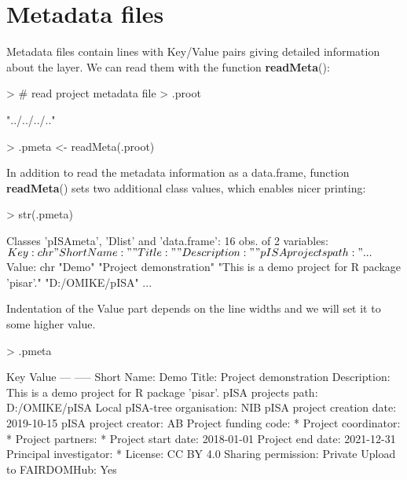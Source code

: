 \documentclass[a4paper,12pt]{article}\usepackage[]{graphicx}\usepackage[]{color}
\makeatletter
\providecommand\code{\bgroup\@codex}
\def\@codex#1{{\normalfont\ttfamily\hyphenchar\font=-1  #1}\egroup}
\providecommand{\fct}[1]{{\ttfamily\textbf{#1}()}}
\makeatother
\begin{document}
\section{Metadata files}

Metadata files contain lines with Key/Value pairs
giving detailed information about the layer. We can read them with the function \fct{readMeta}:

\begin{Schunk}
\begin{Sinput}
> # read project metadata file
> .proot
\end{Sinput}
\begin{Soutput}
[1] "../../../.."
\end{Soutput}
\begin{Sinput}
> .pmeta <- readMeta(.proot)
\end{Sinput}
\end{Schunk}

In addition to read the metadata information as a \code{data.frame}, function
\fct{readMeta} sets two additional class values, which enables nicer printing:

\begin{Schunk}
\begin{Sinput}
> str(.pmeta)
\end{Sinput}
\begin{Soutput}
Classes 'pISAmeta', 'Dlist' and 'data.frame':	16 obs. of  2 variables:
 $ Key  : chr  "Short Name:" "Title:" "Description:" "pISA projects path:" ...
 $ Value: chr  "Demo" "Project demonstration" "This is a demo project for R package 'pisar'." "D:/OMIKE/pISA" ...
\end{Soutput}
\end{Schunk}

Indentation of the Value part depends on the line widths and we will set it to some higher value.

\begin{Schunk}
\begin{Sinput}
> .pmeta
\end{Sinput}
\begin{Soutput}
 Key                           Value
 ---                           -----
 Short Name:                   Demo
 Title:                        Project demonstration
 Description:                  This is a demo project for R package 'pisar'.
 pISA projects path:           D:/OMIKE/pISA
 Local pISA-tree organisation: NIB
 pISA project creation date:   2019-10-15
 pISA project creator:         AB
 Project funding code:         *
 Project coordinator:          *
 Project partners:             *
 Project start date:           2018-01-01
 Project end date:             2021-12-31
 Principal investigator:       *
 License:                      CC BY 4.0
 Sharing permission:           Private
 Upload to FAIRDOMHub:         Yes
\end{Soutput}
\end{Schunk}
\end{document}
